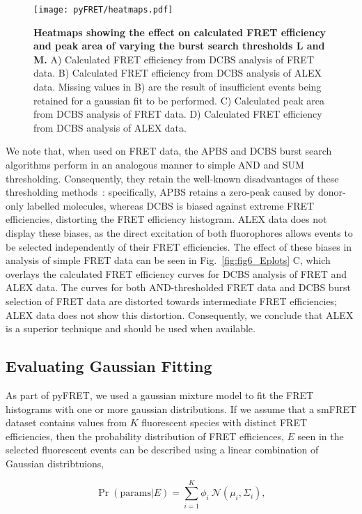 \begin{figure}[!ht]
   \begin{center}
      \texttt{[image: pyFRET/heatmaps.pdf]}
      \caption{{\bf Heatmaps showing the effect on calculated FRET efficiency and peak area of varying the burst search thresholds L and M.} A) Calculated FRET efficiency from DCBS analysis of FRET data. B) Calculated FRET efficiency from DCBS analysis of ALEX data. Missing values in B) are the result of insufficient events being retained for a gaussian fit to be performed. C) Calculated peak area from DCBS analysis of FRET data. D) Calculated FRET efficiency from DCBS analysis of ALEX data.}
      \label{fig:fig8_heatmaps}
   \end{center}
\end{figure}

We note that, when used on FRET data, the APBS and DCBS burst search algorithms perform in an analogous manner to simple AND and SUM thresholding. Consequently, they retain the well-known disadvantages of these thresholding methods~\cite{murphy14}: specifically, APBS retains a zero-peak caused by donor-only labelled molecules, whereas DCBS is biased against extreme FRET efficiencies, distorting the FRET efficiency histogram. ALEX data does not display these biases, as the direct excitation of both fluorophores allows events to be selected independently of their FRET efficiencies. The effect of these biases in analysis of simple FRET data can be seen in Fig.~\ref{fig:fig6_Eplots} C, which overlays the calculated FRET efficiency curves for DCBS analysis of FRET and ALEX data. The curves for both AND-thresholded FRET data and DCBS burst selection of FRET data are distorted towards intermediate FRET efficiencies; ALEX data does not show this distortion. Consequently, we conclude that ALEX is a superior technique and should be used when available.

\subsection{Evaluating Gaussian Fitting}
As part of pyFRET, we used a gaussian mixture model to fit the FRET histograms with one or more gaussian distributions. If we assume that a smFRET dataset contains values from $K$ fluorescent species with distinct FRET efficiencies, then the probability distribution of FRET efficiences, $E$ seen in the selected fluorescent events can be described using a linear combination of Gaussian distribtuions, 

\begin{equation}
\Pr(\text{params}|E) = \sum_{i=1}^K \phi_i~\mathcal{N}(\mu_i, \Sigma_i),
\label{eq:gmm}
\end{equation}

